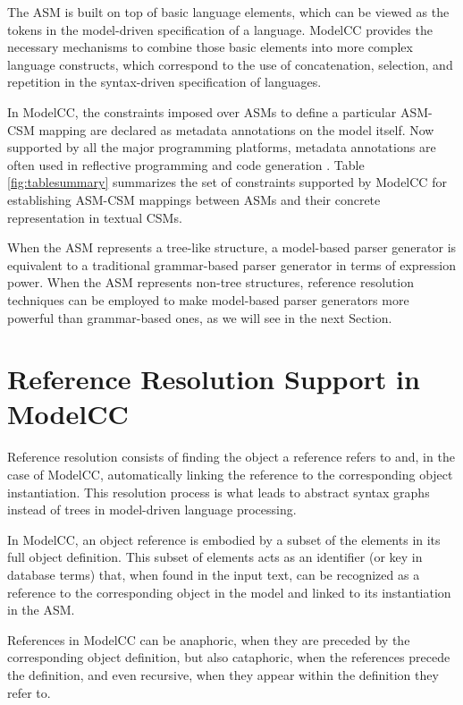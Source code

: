 \documentclass[floatfix,rmp,twocolumn,twoside]{revtex4}
\begin{document}
The ASM is built on top of basic language elements, which can be viewed as the tokens in the model-driven specification of a language. ModelCC provides the necessary mechanisms to combine those basic elements into more complex language constructs, which correspond to the use of concatenation, selection, and repetition in the syntax-driven specification of languages.

In ModelCC, the constraints imposed over ASMs to define a particular ASM-CSM mapping are declared as metadata annotations on the model itself. Now supported by all the major programming platforms, metadata annotations are often used in reflective programming and code generation \cite{Fowler2002}. Table \ref{fig:tablesummary} summarizes the set of constraints supported by ModelCC for establishing ASM-CSM mappings between ASMs and their concrete representation in textual CSMs.

When the ASM represents a tree-like structure, a model-based parser generator is equivalent to a traditional grammar-based parser generator in terms of expression power. When the ASM represents non-tree structures, reference resolution techniques can be employed to make model-based parser generators more powerful than grammar-based ones, as we will see in the next Section.

\section{Reference Resolution Support in ModelCC} \label{sec:graphicallanguagesupport}

Reference resolution consists of finding the object a reference refers to and, in the case of ModelCC, automatically linking the reference to the corresponding object instantiation. This resolution process is what leads to abstract syntax graphs instead of trees in model-driven language processing.

In ModelCC, an object reference is embodied by a subset of the elements in its full object definition. This subset of elements acts as an identifier (or key in database terms) that, when found in the input text, can be recognized as a reference to the corresponding object in the model and linked to its instantiation in the ASM.

References in ModelCC can be anaphoric, when they are preceded by the corresponding object definition, but also cataphoric, when the references precede the definition, and even recursive, when they appear within the definition they refer to.
\end{document}
